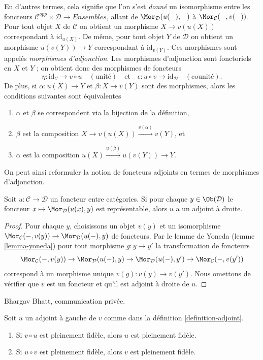 \noindent
En d'autres termes, cela signifie que l'on s'est {\it donné} un isomorphisme entre
les foncteurs $\mathcal{C}^{opp} \times \mathcal{D} \to \textit{Ensembles}$, allant de
$\Mor_\mathcal{D}(u(-), -)$ à $\Mor_\mathcal{C}(-, v(-))$. Pour tout objet $X$
de $\mathcal{C}$ on obtient un morphisme $X \to v(u(X))$ correspondant à
$\text{id}_{u(X)}$. De même, pour tout objet $Y$ de $\mathcal{D}$ on obtient
un morphisme $u(v(Y)) \to Y$ correspondant à $\text{id}_{v(Y)}$. Ces
morphismes sont appelés {\it morphismes d'adjonction}. Les morphismes
d'adjonction sont fonctoriels en $X$ et $Y$ ; on obtient donc des morphismes
de foncteurs
$$
\eta : \text{id}_\mathcal{C} \to v \circ u\quad (\text{unité})
\quad\text{et}\quad
\epsilon : u \circ v \to \text{id}_\mathcal{D}\quad (\text{counité}).
$$
De plus, si $\alpha : u(X) \to Y$ et $\beta : X \to v(Y)$ sont des morphismes,
alors les conditions suivantes sont équivalentes
\begin{enumerate}
\item $\alpha$ et $\beta$ se correspondent via la bijection de la définition,
\item $\beta$ est la composition $X \to v(u(X)) \xrightarrow{v(\alpha)} v(Y)$,
et
\item $\alpha$ est la composition $u(X) \xrightarrow{u(\beta)} u(v(Y)) \to Y$.
\end{enumerate}
On peut ainsi reformuler la notion de foncteurs adjoints en termes de
morphismes d'adjonction.

\begin{lemma}
\label{lemma-adjoint-exists}
Soit $u : \mathcal{C} \to \mathcal{D}$ un foncteur entre catégories. Si pour
chaque $y \in \Ob(\mathcal{D})$ le foncteur $x \mapsto \Mor_\mathcal{D}(u(x), y)$ est représentable, alors $u$ a un adjoint à droite.
\end{lemma}

\begin{proof}
Pour chaque $y$, choisissons un objet $v(y)$ et un isomorphisme
$\Mor_\mathcal{C}(-, v(y)) \to \Mor_\mathcal{D}(u(-), y)$ de foncteurs. Par le
lemme de Yoneda (lemme \ref{lemma-yoneda}) pour tout morphisme $g : y \to y'$
la transformation de foncteurs
$$
\Mor_\mathcal{C}(-, v(y)) \to \Mor_\mathcal{D}(u(-), y) \to
\Mor_\mathcal{D}(u(-), y') \to \Mor_\mathcal{C}(-, v(y'))
$$
correspond à un morphisme unique $v(g) : v(y) \to v(y')$. Nous omettons de
vérifier que $v$ est un foncteur et qu'il est adjoint à droite de $u$.
\end{proof}

\begin{lemma}
\label{lemma-left-adjoint-composed-fully-faithful}
\begin{reference}
Bhargav Bhatt, communication privée.
\end{reference}
Soit $u$ un adjoint à gauche de $v$ comme dans la définition
\ref{definition-adjoint}.
\begin{enumerate}
\item Si $v \circ u$ est pleinement fidèle, alors $u$ est pleinement fidèle.
\item Si $u \circ v$ est pleinement fidèle, alors $v$ est pleinement fidèle.
\end{enumerate}
\end{lemma}

